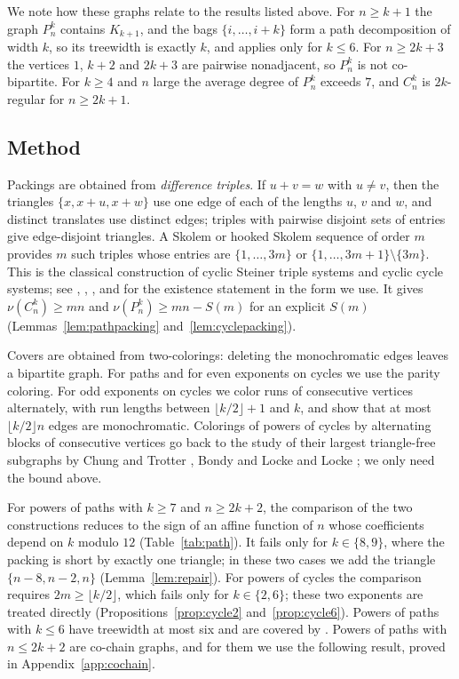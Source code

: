 \documentclass{amsart}
\theoremstyle{definition}
\theoremstyle{remark}
\numberwithin{equation}{section}
\numberwithin{table}{section}
\begin{document}
We note how these graphs relate to the results listed above. For $n\ge k+1$ the graph $P_n^k$ contains $K_{k+1}$, and the bags $\{i,\dots,i+k\}$ form a path decomposition of width $k$, so its treewidth is exactly $k$, and \cite[Theorem~3.4]{BFG} applies only for $k\le6$. For $n\ge2k+3$ the vertices $1$, $k+2$ and $2k+3$ are pairwise nonadjacent, so $P_n^k$ is not co-bipartite. For $k\ge4$ and $n$ large the average degree of $P_n^k$ exceeds $7$, and $C_n^k$ is $2k$-regular for $n\ge2k+1$.

\subsection*{Method}
Packings are obtained from \emph{difference triples}. If $u+v=w$ with $u\ne v$, then the triangles $\{x,x+u,x+w\}$ use one edge of each of the lengths $u$, $v$ and $w$, and distinct translates use distinct edges; triples with pairwise disjoint sets of entries give edge-disjoint triangles. A Skolem or hooked Skolem sequence of order $m$ provides $m$ such triples whose entries are $\{1,\dots,3m\}$ or $\{1,\dots,3m+1\}\setminus\{3m\}$. This is the classical construction of cyclic Steiner triple systems and cyclic cycle systems; see \cite[Section~1]{BGL}, \cite{Skolem}, \cite{OKeefe}, and \cite[Theorem~5.3]{BBW} for the existence statement in the form we use. It gives $\nu(C_n^k)\ge mn$ and $\nu(P_n^k)\ge mn-S(m)$ for an explicit $S(m)$ (Lemmas~\ref{lem:pathpacking} and~\ref{lem:cyclepacking}).

Covers are obtained from two-colorings: deleting the monochromatic edges leaves a bipartite graph. For paths and for even exponents on cycles we use the parity coloring. For odd exponents on cycles we color runs of consecutive vertices alternately, with run lengths between $\lfloor k/2\rfloor+1$ and $k$, and show that at most $\lfloor k/2\rfloor n$ edges are monochromatic. Colorings of powers of cycles by alternating blocks of consecutive vertices go back to the study of their largest triangle-free subgraphs by Chung and Trotter \cite{ChungTrotter}, Bondy and Locke \cite{BondyLocke} and Locke \cite{Locke}; we only need the bound above.

For powers of paths with $k\ge7$ and $n\ge2k+2$, the comparison of the two constructions reduces to the sign of an affine function of $n$ whose coefficients depend on $k$ modulo $12$ (Table~\ref{tab:path}). It fails only for $k\in\{8,9\}$, where the packing is short by exactly one triangle; in these two cases we add the triangle $\{n-8,n-2,n\}$ (Lemma~\ref{lem:repair}). For powers of cycles the comparison requires $2m\ge\lfloor k/2\rfloor$, which fails only for $k\in\{2,6\}$; these two exponents are treated directly (Propositions~\ref{prop:cycle2} and~\ref{prop:cycle6}). Powers of paths with $k\le6$ have treewidth at most six and are covered by \cite[Theorem~3.4]{BFG}. Powers of paths with $n\le2k+2$ are co-chain graphs, and for them we use the following result, proved in Appendix~\ref{app:cochain}.
\end{document}
